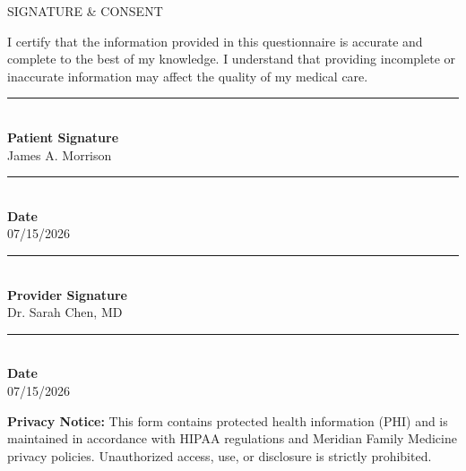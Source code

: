 \documentclass[11pt,letterpaper]{article}
\begin{document}
\vspace{12pt}

\begin{secbox}
SIGNATURE \& CONSENT
\end{secbox}

\vspace{4pt}

I certify that the information provided in this questionnaire is accurate and complete to the best of my knowledge. I understand that providing incomplete or inaccurate information may affect the quality of my medical care.

\vspace{10pt}

\begin{minipage}[t]{0.48\textwidth}
\rule{\linewidth}{0.4pt}\\[4pt]
{\small\textbf{Patient Signature}}\\[2pt]
{\small James A. Morrison}
\end{minipage}
\hfill
\begin{minipage}[t]{0.48\textwidth}
\rule{\linewidth}{0.4pt}\\[4pt]
{\small\textbf{Date}}\\[2pt]
{\small 07/15/2026}
\end{minipage}

\par

\vspace{12pt}

\begin{minipage}[t]{0.48\textwidth}
\rule{\linewidth}{0.4pt}\\[4pt]
{\small\textbf{Provider Signature}}\\[2pt]
{\small Dr. Sarah Chen, MD}
\end{minipage}
\hfill
\begin{minipage}[t]{0.48\textwidth}
\rule{\linewidth}{0.4pt}\\[4pt]
{\small\textbf{Date}}\\[2pt]
{\small 07/15/2026}
\end{minipage}

\par

\vspace{10pt}

\begin{infobox}
\textbf{Privacy Notice:} This form contains protected health information (PHI) and is maintained in accordance with HIPAA regulations and Meridian Family Medicine privacy policies. Unauthorized access, use, or disclosure is strictly prohibited.
\end{infobox}
\end{document}

